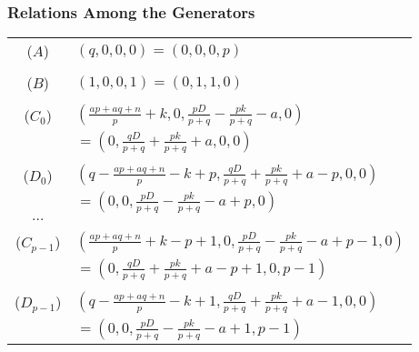 \documentclass{beamer}
\begin{document}
\begin{frame}[noframenumbering]
\begin{center}
\frametitle{Relations Among the Generators}

{\scriptsize
\begin{center}
\begin{tabular}{cl}
($A$) & $\left(q, 0, 0, 0\right)=\left(0, 0, 0, p\right)$\\
 &\\
($B$) & $\left(1, 0, 0, 1\right) = \left(0, 1, 1, 0\right)$\\
 &\\
($C_0$) & $\left(\frac{a p + a q + n}{p} + k, 0, \frac{p D}{p + q} - \frac{p k}{p + q} - a, 0\right)$\\
 & $ = \left(0, \frac{q D}{p + q} + \frac{p k}{p + q} + a, 0, 0\right)$\\
 &\\
($D_0$) & $\left(q - \frac{a p + a q + n}{p} - k + p, \frac{q D}{p + q} + \frac{p k}{p + q} + a - p, 0, 0\right)$\\
 & $ = \left(0, 0, \frac{p D}{p + q} - \frac{p k}{p + q} - a + p, 0\right)$\\
$\dots$ &\\
 &\\
($C_{p - 1}$) & $\left(\frac{a p + a q + n}{p} + k - p + 1, 0, \frac{p D}{p + q} - \frac{p k}{p + q} - a + p - 1, 0\right)$\\
 & $ = \left(0, \frac{q D}{p + q} + \frac{p k}{p + q} + a - p + 1, 0, p - 1\right)$\\
 &\\
($D_{p - 1}$) & $\left(q - \frac{a p + a q + n}{p} - k + 1, \frac{q D}{p + q} + \frac{p k}{p + q} + a - 1, 0, 0\right)$\\
 & $ = \left(0, 0, \frac{p D}{p + q} - \frac{p k}{p + q} - a + 1, p - 1\right)$\\
\end{tabular}
\end{center}
}

\end{center}
\end{frame}

\end{document}
